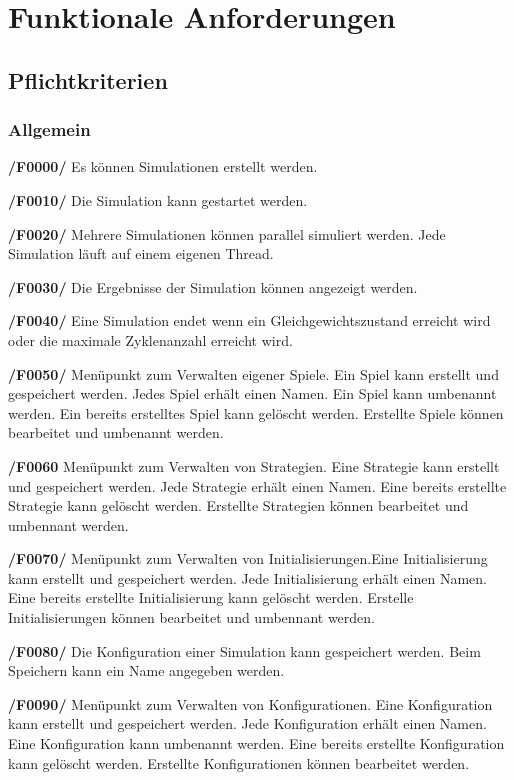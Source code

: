 \section{Funktionale Anforderungen}

\subsection{Pflichtkriterien}

\subsubsection{Allgemein}

\textbf{/F0000/}
Es können Simulationen erstellt werden.

\textbf{/F0010/} 
Die Simulation kann gestartet werden.

\textbf{/F0020/}
{\color{red} Mehrere Simulationen können parallel simuliert werden. Jede Simulation läuft auf einem eigenen Thread.
}

\textbf{/F0030/} 
Die Ergebnisse der Simulation können angezeigt werden.

\textbf{/F0040/}
Eine Simulation endet wenn ein Gleichgewichtszustand erreicht wird oder
die maximale Zyklenanzahl erreicht wird.

\textbf{/F0050/}
Menüpunkt zum Verwalten eigener Spiele. Ein Spiel kann erstellt und gespeichert werden. Jedes Spiel erhält einen Namen. Ein Spiel kann umbenannt werden. Ein bereits erstelltes Spiel kann gelöscht werden. Erstellte Spiele können bearbeitet und umbenannt werden.

\textbf{/F0060}
Menüpunkt zum Verwalten von Strategien. Eine Strategie kann erstellt und gespeichert werden. Jede Strategie erhält einen Namen. Eine bereits erstellte Strategie kann gelöscht werden. Erstellte Strategien können bearbeitet und umbennant werden.

\textbf{/F0070/}
Menüpunkt zum Verwalten von Initialisierungen.Eine Initialisierung kann erstellt und gespeichert werden. Jede Initialisierung  erhält einen Namen. Eine bereits erstellte Initialisierung kann gelöscht werden. Erstelle Initialisierungen können bearbeitet und umbennant werden.

\textbf{/F0080/}
Die Konfiguration einer Simulation kann gespeichert werden. Beim Speichern kann ein Name angegeben werden.

\textbf{/F0090/}
Menüpunkt zum Verwalten von Konfigurationen. Eine Konfiguration kann erstellt und gespeichert werden. Jede Konfiguration erhält einen Namen. Eine Konfiguration kann umbenannt werden. Eine bereits erstellte Konfiguration kann gelöscht werden. Erstellte Konfigurationen können bearbeitet werden.


